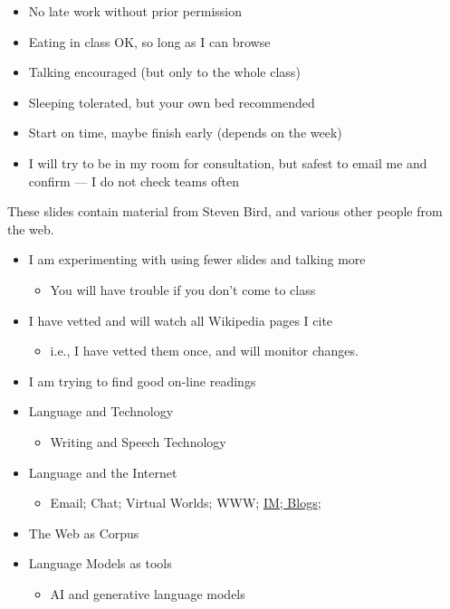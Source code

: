 \documentclass[a4paper,landscape,headrule,footrule,xetex]{foils}
\begin{document}
\begin{itemize}
\item No late work without prior permission
\item Eating in class OK, so long as I can browse
\item Talking encouraged (but only to the whole class)
\item Sleeping tolerated, but your own bed recommended
\item Start on time, maybe finish early (depends on the week)
\item I will try to be in my room for consultation, but safest to
  email me and confirm --- I do not check teams often
  
\end{itemize}


These slides contain material from Steven Bird, and various other people from the web.

\begin{itemize}
\item I am experimenting with using fewer slides and talking more
  \begin{itemize}
  \item You will have trouble if you don't come to class
  \end{itemize}
\item I have vetted and will watch all Wikipedia pages I cite
  \begin{itemize}
  \item i.e., I have vetted them once, and will monitor changes.
  \end{itemize}
\item I am trying to find good on-line readings
\end{itemize}



\begin{itemize}
\item Language and Technology
  \begin{itemize}
  \item Writing and Speech Technology
  \end{itemize}
\item Language and the Internet
  \begin{itemize}
  \item Email; Chat; Virtual Worlds; WWW; \ul{IM; Blogs}; 
  \end{itemize}
\item The Web as Corpus
\item Language Models as tools
  \begin{itemize}
  \item AI and generative language models
  \end{itemize}
\end{itemize}
\end{document}
